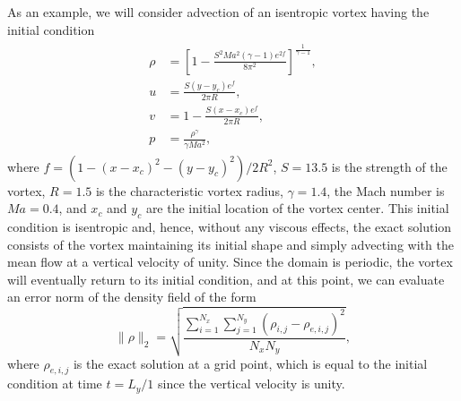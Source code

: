 As an example, we will consider advection of an isentropic vortex having the initial condition
\begin{eqnarray}
\begin{split}
\rho & = \left[1-\frac{S^2Ma^2(\gamma-1)e^{2f}}{8\pi^2}\right]^{\frac{1}{\gamma-1}},\\
u& = \frac{S(y-y_c)e^f}{2\pi R},\\
v& = 1-\frac{S(x-x_c)e^f}{2\pi R},\\
p& = \frac{\rho^\gamma}{\gamma Ma^2},
\end{split}
\end{eqnarray}
where $f = (1-(x-x_c)^2-(y-y_c)^2)/2R^2$, $S = 13.5$ is the strength of the vortex, $R=1.5$ is the characteristic vortex radius, $\gamma = 1.4$, the Mach number is $Ma = 0.4$, and $x_c$ and $y_c$ are the initial location of the vortex center. This initial condition is isentropic and, hence, without any viscous effects, the exact solution consists of the vortex maintaining its initial shape and simply advecting with the mean flow at a vertical velocity of unity. Since the domain is periodic, the vortex will eventually return to its initial condition, and at this point, we can evaluate an error norm of the density field of the form
\begin{equation}
	\| \rho \|_2 = \sqrt{\frac{\sum_{i=1}^{N_x} \sum_{j=1}^{N_y} \left(\rho_{i,j} - \rho_{e,i,j}\right)^2}{N_x N_y}},
\end{equation}
where $\rho_{e,i,j}$ is the exact solution at a grid point, which is equal to the initial condition at time $t = L_y/1$ since the vertical velocity is unity.

